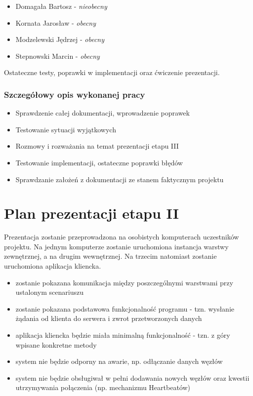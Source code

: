 \begin{itemize}
\item Domagała Bartosz - \textit{nieobecny}
\item Kornata Jarosław - \textit{obecny}
\item Modzelewski Jędrzej - \textit{obecny}
\item Stepnowski Marcin - \textit{obecny}
\end{itemize}

\par{Ostateczne testy, poprawki w implementacji oraz ćwiczenie prezentacji.}

\subsubsection*[Szczegółowy opis wykonanej pracy]{Szczegółowy opis wykonanej pracy}
\begin{itemize}
\item Sprawdzenie całej dokumentacji, wprowadzenie poprawek
\item Testowanie sytuacji wyjątkowych
\item Rozmowy i rozważania na temat prezentacji etapu III
\item Testowanie implementacji, ostateczne poprawki błędów
\item Sprawdzanie założeń z dokumentacji ze stanem faktycznym projektu
\end{itemize}

\pagebreak

\section[Plan prezentacji etapu II]{Plan prezentacji etapu II}
\par{Prezentacja zostanie przeprowadzona na osobistych komputerach uczestników projektu. Na jednym komputerze zostanie uruchomiona instancja warstwy zewnętrznej, a na drugim wewnętrznej. Na trzecim natomiast zostanie uruchomiona aplikacja kliencka.}

\begin{itemize}
\item zostanie pokazana komunikacja między poszczególnymi warstwami przy ustalonym scenariuszu
\item zostanie pokazana podstawowa funkcjonalność programu - tzn. wysłanie żądania od klienta do serwera i zwrot przetworzonych danych
\item aplikacja kliencka będzie miała minimalną funkcjonalność - tzn. z góry wpisane konkretne metody
\item system nie będzie odporny na awarie, np. odłączanie danych węzłów
\item system nie będzie obsługiwał w pełni dodawania nowych węzłów oraz kwestii utrzymywania połączenia (np. mechanizmu Heartbeatów)
\end{itemize}

